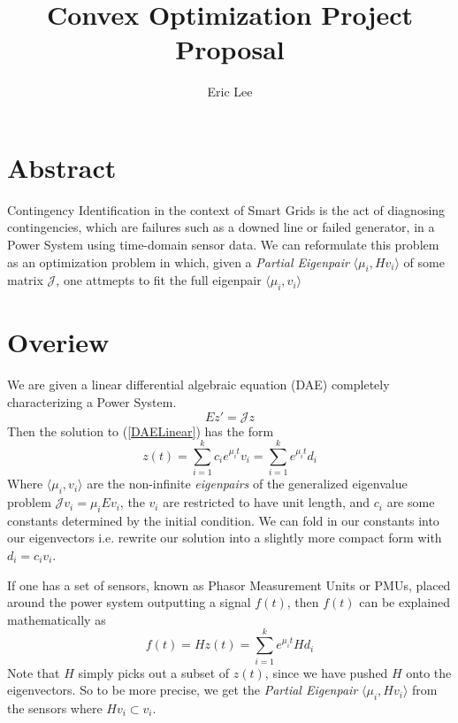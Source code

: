 

\title{Convex Optimization Project Proposal}
\author{Eric Lee }
\date{}


\maketitle

\section{Abstract}
Contingency Identification in the context of Smart Grids is the act of diagnosing contingencies, which are failures such as a downed line or failed generator, in a Power System using time-domain sensor data. We can reformulate this problem as an optimization problem in which, given a \textit{Partial Eigenpair} $\langle \mu_i,Hv_i \rangle$ of some matrix $\mathcal{J}$, one attmepts to fit the full eigenpair $\langle \mu_i,v_i \rangle$
\section{Overiew}
We are given a linear differential algebraic equation (DAE) completely characterizing a Power System. 
\begin{equation} \label{DAELinear}
Ez' = \mathcal{J} z
\end{equation}
Then the solution to (\ref{DAELinear}) has the form
\begin{equation}\label{DAESolution}
z(t) = \sum_{i = 1}^{k} c_i e^{\mu_it}v_i = \sum_{i = 1}^{k} e^{\mu_it}d_i
\end{equation}
Where $\langle \mu_i,v_i \rangle$ are the non-infinite \textit{eigenpairs} of the generalized eigenvalue problem $\mathcal{J} v_i = \mu_i Ev_i $, the $v_i$ are restricted to have unit length, and $c_i$ are some constants determined by the initial condition. We can fold in our constants into our eigenvectors i.e. rewrite our solution into a slightly more compact form with $d_i = c_i v_i$. 

If one has a set of sensors, known as Phasor Measurement Units or PMUs, placed around the power system outputting a signal $f(t)$, then $f(t)$ can be explained mathematically as 
\begin{equation}\label{PMUSolution}
f(t) = Hz(t) = \sum_{i = 1}^{k} e^{\mu_it}Hd_i
\end{equation}
Note that $H$ simply picks out a subset of $z(t)$, since we have pushed $H$ onto the eigenvectors. So to be more precise, we get the \textit{Partial Eigenpair}
$\langle \mu_i,Hv_i \rangle$ from the sensors where $Hv_i \subset v_i$. 


